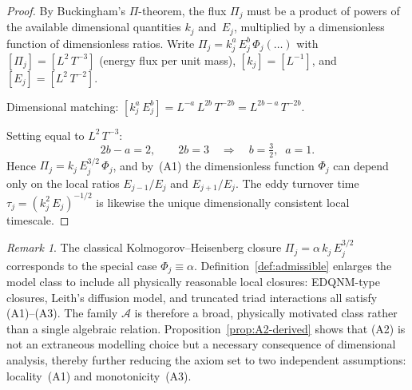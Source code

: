\documentclass[12pt,a4paper]{article}
\theoremstyle{definition}
\theoremstyle{plain}
\theoremstyle{remark}
\newtheorem{remark}[definition]{Remark}
\begin{document}
\begin{proof}
By Buckingham's $\Pi$-theorem, the flux $\Pi_j$ must be a product of powers of the available dimensional quantities $k_j$ and~$E_j$, multiplied by a dimensionless function of dimensionless ratios. Write $\Pi_j = k_j^{a}\,E_j^{b}\,\Phi_j(\ldots)$ with $[\Pi_j] = [L^2\,T^{-3}]$ (energy flux per unit mass), $[k_j] = [L^{-1}]$, and $[E_j] = [L^2\,T^{-2}]$.

Dimensional matching: $[k_j^a\,E_j^b] = L^{-a}\,L^{2b}\,T^{-2b} = L^{2b-a}\,T^{-2b}$.

Setting equal to $L^2\,T^{-3}$:
\[
2b - a = 2, \qquad 2b = 3 \quad\Longrightarrow\quad b = \tfrac{3}{2},\;\; a = 1.
\]
Hence $\Pi_j = k_j\,E_j^{3/2}\,\Phi_j$, and by~(A1) the dimensionless function $\Phi_j$ can depend only on the local ratios $E_{j-1}/E_j$ and $E_{j+1}/E_j$. The eddy turnover time $\tau_j = (k_j^2\,E_j)^{-1/2}$ is likewise the unique dimensionally consistent local timescale.
\end{proof}

\begin{remark}
The classical Kolmogorov--Heisenberg closure $\Pi_j = \alpha\,k_j\,E_j^{3/2}$
corresponds to the special case $\Phi_j \equiv \alpha$.  Definition~\ref{def:admissible}
enlarges the model class to include all physically reasonable local closures:
EDQNM-type closures, Leith's diffusion model, and truncated triad
interactions all satisfy (A1)--(A3).  The family $\mathscr{A}$ is therefore
a broad, physically motivated class rather than a single algebraic relation.
Proposition~\ref{prop:A2-derived} shows that (A2) is not an extraneous modelling choice but a necessary consequence of dimensional analysis, thereby further reducing the axiom set to two independent assumptions: locality~(A1) and monotonicity~(A3).
\end{remark}
\end{document}
